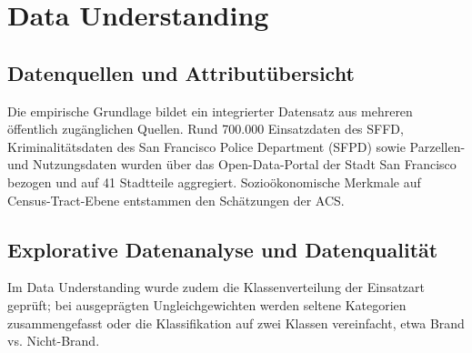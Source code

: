 \documentclass[12pt,a4paper]{article}
\begin{document}
\section{Data Understanding}
\subsection{Datenquellen und Attributübersicht}


Die empirische Grundlage bildet ein integrierter Datensatz aus mehreren öffentlich zugänglichen
Quellen. Rund 700.000 Einsatzdaten des SFFD, Kriminalitätsdaten des San Francisco Police Department
(SFPD) sowie Parzellen- und Nutzungsdaten wurden über das Open-Data-Portal der Stadt San Francisco
bezogen und auf 41 Stadtteile aggregiert. Sozioökonomische Merkmale auf Census-Tract-Ebene
entstammen den Schätzungen der ACS.


\subsection{Explorative Datenanalyse und Datenqualität}


Im Data Understanding wurde zudem die Klassenverteilung der Einsatzart geprüft; bei ausgeprägten
Ungleichgewichten werden seltene Kategorien zusammengefasst oder die Klassifikation auf zwei
Klassen vereinfacht, etwa Brand vs. Nicht-Brand.
\end{document}
